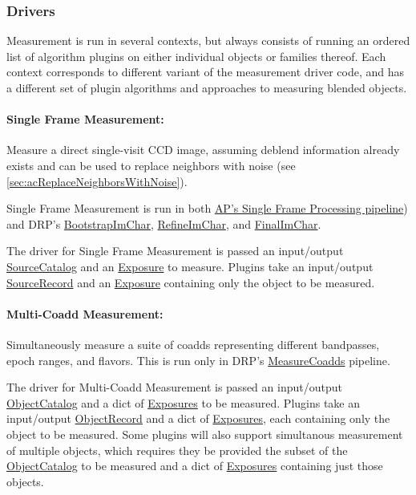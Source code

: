 \subsubsection{Drivers}
\label{sec:acMeasurementDrivers}
Measurement is run in several contexts, but always consists of running an ordered list of algorithm plugins on either individual objects or families thereof.  Each context corresponds to different variant of the measurement driver code, and has a different set of plugin algorithms and approaches to measuring blended objects.

\paragraph{Single Frame Measurement:} Measure a direct single-visit CCD image, assuming deblend information already exists and can be used to replace neighbors with noise (see \ref{sec:acReplaceNeighborsWithNoise}).
\label{sec:acSingleFrameMeasurement}

Single Frame Measurement is run in both \hyperref[sec:apSingleFrameProcessing]{AP's Single Frame Processing pipeline}) and DRP's \hyperref[sec:drpBootstrapImChar]{BootstrapImChar}, \hyperref[sec:drpRefineImChar]{RefineImChar}, and \hyperref[sec:drpFinalImChar]{FinalImChar}.

The driver for Single Frame Measurement is passed an input/output \hyperref[sec:spTablesSource]{SourceCatalog} and an \hyperref[sec:spImagesExposure]{Exposure} to measure.  Plugins take an input/output \hyperref[sec:spTablesSource]{SourceRecord} and an \hyperref[sec:spImagesExposure]{Exposure} containing only the object to be measured.

\paragraph{Multi-Coadd Measurement:} Simultaneously measure a suite of coadds representing different bandpasses, epoch ranges, and flavors.  This is run only in DRP's \hyperref[sec:drpMeasureCoadds]{MeasureCoadds} pipeline.
\label{sec:acMultiCoaddMeasurement}

The driver for Multi-Coadd Measurement is passed an input/output \hyperref[sec:spTablesObject]{ObjectCatalog} and a dict of \hyperref[sec:spImagesExposure]{Exposures} to be measured.  Plugins take an input/output \hyperref[sec:spTablesObject]{ObjectRecord} and a dict of \hyperref[sec:spImagesExposure]{Exposures}, each containing only the object to be measured.  Some plugins will also support simultanous measurement of multiple objects, which requires they be provided the subset of the \hyperref[sec:spTablesObject]{ObjectCatalog} to be measured and a dict of \hyperref[sec:spImagesExposure]{Exposures} containing just those objects.

